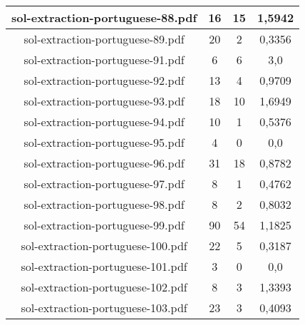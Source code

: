 \documentclass[11pt]{article}
\newlength\mylength
\begin{document}
\begin{center}
\begin{longtable}{||C{.40\mylength}||C{.30\mylength}||C{.30\mylength}||C{.30\mylength}||}
  sol-extraction-portuguese-88.pdf & 16 & 15 & 1,5942 \\  \hline
  sol-extraction-portuguese-89.pdf & 20 & 2 & 0,3356 \\  \hline
  sol-extraction-portuguese-91.pdf & 6 & 6 & 3,0 \\  \hline
  sol-extraction-portuguese-92.pdf & 13 & 4 & 0,9709 \\  \hline
  sol-extraction-portuguese-93.pdf & 18 & 10 & 1,6949 \\  \hline
  sol-extraction-portuguese-94.pdf & 10 & 1 & 0,5376 \\  \hline
  sol-extraction-portuguese-95.pdf & 4 & 0 & 0,0 \\  \hline
  sol-extraction-portuguese-96.pdf & 31 & 18 & 0,8782 \\  \hline
  sol-extraction-portuguese-97.pdf & 8 & 1 & 0,4762 \\  \hline
  sol-extraction-portuguese-98.pdf & 8 & 2 & 0,8032 \\  \hline
  sol-extraction-portuguese-99.pdf & 90 & 54 & 1,1825 \\  \hline
  sol-extraction-portuguese-100.pdf & 22 & 5 & 0,3187 \\  \hline
  sol-extraction-portuguese-101.pdf & 3 & 0 & 0,0 \\  \hline
  sol-extraction-portuguese-102.pdf & 8 & 3 & 1,3393 \\  \hline
  sol-extraction-portuguese-103.pdf & 23 & 3 & 0,4093 \\  \hline

\end{longtable}
\end{center}
\end{document}
